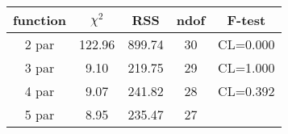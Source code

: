 \begin{tabular}{c|c|c|c|c}
function & $\chi^2$ & RSS & ndof & F-test \\
\hline
2 par & 122.96 & 899.74 & 30 & CL=0.000 \\
3 par & 9.10 & 219.75 & 29 & CL=1.000 \\
4 par & 9.07 & 241.82 & 28 & CL=0.392 \\
5 par & 8.95 & 235.47 & 27 & \\
\hline
\end{tabular}